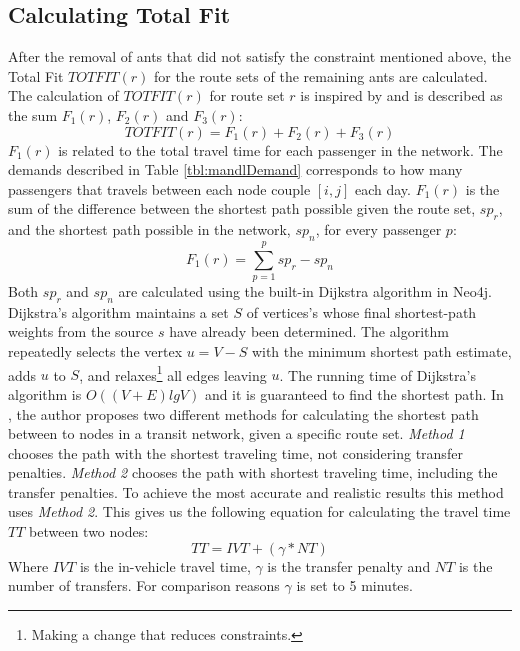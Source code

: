 \subsection{Calculating Total Fit}
After the removal of ants that did not satisfy the constraint mentioned above, the Total Fit $TOTFIT(r)$ for the route sets of the remaining ants are calculated. The calculation of $TOTFIT(r)$ for route set $r$ is inspired by \citep{kechagiopoulos14} and is described as the sum $F_{1}(r)$, $F_{2}(r)$ and $F_{3}(r)$: 
\newline
$$ TOTFIT(r) = F_{1}(r) + F_{2}(r) + F_{3}(r)$$
\newline
$F_{1}(r)$ is related to the total travel time for each passenger in the network. The demands described in Table \vref{tbl:mandlDemand} corresponds to how many passengers that travels between each node couple $[i,j]$ each day. $F_{1}(r)$ is the sum of the difference between the shortest path possible given the route set, $sp_r$, and the shortest path possible in the network, $sp_n$, for every passenger $p$:
\newline
$$F_{1}(r) = \sum\limits^{p}_{p=1}sp_r-sp_n$$
\newline
Both $sp_r$ and $sp_n$ are calculated using the built-in Dijkstra algorithm in Neo4j. Dijkstra's algorithm \cite[p.658-662]{cormen09} maintains a set $S$ of vertices's whose final shortest-path weights from the source $s$ have already been determined. The algorithm repeatedly selects the vertex $u = V - S$ with the minimum shortest path estimate, adds $u$ to $S$, and relaxes\footnote{Making a change that reduces constraints.} all edges leaving $u$. The running time of Dijkstra's algorithm is $O((V + E)lg V)$ and it is guaranteed to find the shortest path\cite[p.~661]{cormen09}. In \citep{mandl79}, the author proposes two different methods for calculating the shortest path between to nodes in a transit network, given a specific route set. \textit{Method 1} chooses the path with the shortest traveling time, not considering transfer penalties. \textit{Method 2} chooses the path with shortest traveling time, including the transfer penalties. To achieve the most accurate and realistic results this method uses \textit{Method 2}. This gives us the following equation for calculating the travel time $TT$ between two nodes: 
\newline
$$TT = IVT + (\gamma*NT)$$
\newline
Where $IVT$ is the in-vehicle travel time, $\gamma$ is the transfer penalty and $NT$ is the number of transfers. For comparison reasons $\gamma$ is set to 5 minutes. 


